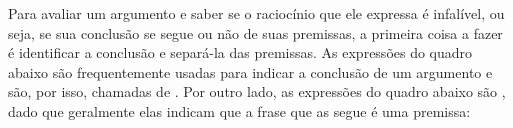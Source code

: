 Para avaliar um argumento e saber se o raciocínio que ele expressa é infalível, ou seja, se sua conclusão se segue ou não de suas premissas, a primeira coisa a fazer é identificar a conclusão e separá-la das premissas.
As expressões do quadro abaixo são frequentemente usadas para indicar a conclusão de um argumento e são, por isso, chamadas de .
Por outro lado, as expressões do quadro abaixo são , dado que geralmente elas indicam que a frase que as segue é uma premissa:



